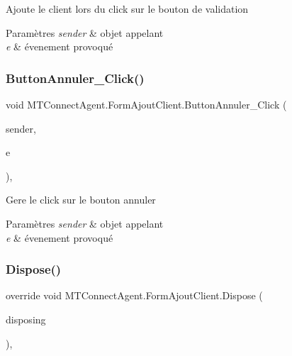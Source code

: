 Ajoute le client lors du click sur le bouton de validation 


\begin{DoxyParams}{Paramètres}
{\em sender} & objet appelant\\
\hline
{\em e} & évenement provoqué\\
\hline
\end{DoxyParams}
\mbox{\label{class_m_t_connect_agent_1_1_form_ajout_client_af93482854806707014064fc913d60a12}} 
\subsubsection{\texorpdfstring{Button\+Annuler\+\_\+\+Click()}{ButtonAnnuler\_Click()}}
{\footnotesize\ttfamily void M\+T\+Connect\+Agent.\+Form\+Ajout\+Client.\+Button\+Annuler\+\_\+\+Click (\begin{DoxyParamCaption}\item[{object}]{sender,  }\item[{Event\+Args}]{e }\end{DoxyParamCaption})\hspace{0.3cm}{\ttfamily [inline]}, {\ttfamily [private]}}



Gere le click sur le bouton annuler 


\begin{DoxyParams}{Paramètres}
{\em sender} & objet appelant\\
\hline
{\em e} & évenement provoqué\\
\hline
\end{DoxyParams}
\mbox{\label{class_m_t_connect_agent_1_1_form_ajout_client_ac88e5455f9da53d0479aaeb68eaa2497}} 
\subsubsection{\texorpdfstring{Dispose()}{Dispose()}}
{\footnotesize\ttfamily override void M\+T\+Connect\+Agent.\+Form\+Ajout\+Client.\+Dispose (\begin{DoxyParamCaption}\item[{bool}]{disposing }\end{DoxyParamCaption})\hspace{0.3cm}{\ttfamily [inline]}, {\ttfamily [protected]}}



